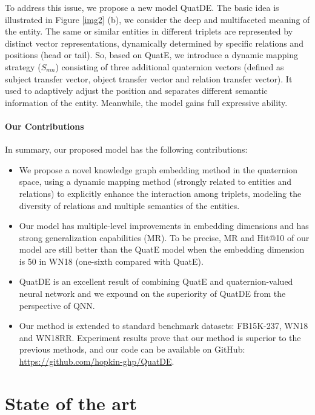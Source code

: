 \documentclass[letterpaper]{article} \usepackage{aaai20}  \usepackage{times}  \usepackage{helvet} \usepackage{courier}  \usepackage[hyphens]{url}  \usepackage{graphicx} \usepackage{lineno,hyperref,amsmath,amssymb}
\begin{document}
To address this issue, we propose a new model QuatDE. The basic idea is illustrated in Figure \ref{img2} (b), we consider the deep and multifaceted meaning of the entity. The same or similar entities in different triplets are represented by distinct vector representations, dynamically determined by specific relations and positions (head or tail). So, based on QuatE, we introduce a dynamic mapping strategy ($S_{mn}$) consisting of three additional quaternion vectors (defined as subject transfer vector, object transfer vector and relation transfer vector). It used to adaptively adjust the position and separates different semantic information of the entity. Meanwhile, the model gains full expressive ability.

\paragraph{ \textbf{Our Contributions}}In summary, our proposed model has the following contributions:

\begin{itemize}

\item We propose a novel knowledge graph embedding method in the quaternion space, using a dynamic mapping method (strongly related to entities and relations) to explicitly enhance the interaction among triplets, modeling the diversity of relations and multiple semantics of the entities.
\item Our model has multiple-level improvements in embedding dimensions and has strong generalization capabilities (MR). To be precise, MR and Hit@10 of our model are still better than the QuatE model when the embedding dimension is 50 in WN18 (one-sixth compared with QuatE).
\item QuatDE is an excellent result of combining QuatE and quaternion-valued neural network and we expound on the superiority of QuatDE from the perspective of QNN.
\item Our method is extended to standard benchmark datasets: FB15K-237, WN18 and WN18RR. Experiment results prove that our method is superior to the previous methods, and our code can be available on GitHub: \url{https://github.com/hopkin-ghp/QuatDE}.

\end{itemize}

\section{State of the art}
\end{document}

